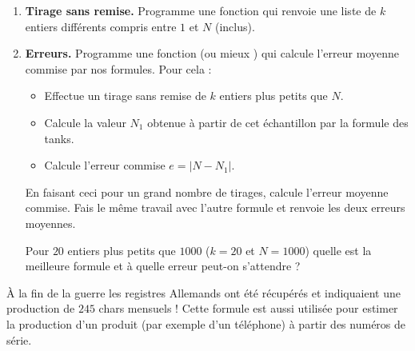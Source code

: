 \documentclass[11pt,class=report,crop=false]{standalone}
\begin{document}
\begin{activite}
\begin{enumerate}
		\item \textbf{Tirage sans remise.}
		Programme une fonction  qui renvoie une liste de $k$ entiers différents compris entre $1$ et $N$ (inclus).
		
		\item \textbf{Erreurs.} Programme une fonction 
		(ou mieux ) qui calcule l'erreur moyenne commise par nos formules. 
		Pour cela :
		\begin{itemize}
			\item Effectue un tirage sans remise de $k$ entiers plus petits que $N$.
			\item Calcule la valeur $N_1$ obtenue à partir de cet échantillon par la formule des tanks.
			\item Calcule l'erreur commise $e = | N - N_1 |$. 
		\end{itemize}
		En faisant ceci pour un grand nombre de tirages, calcule l'erreur moyenne commise.
		Fais le même travail avec l'autre formule et renvoie les deux erreurs moyennes.
		
		Pour $20$ entiers plus petits que $1000$ ($k=20$ et $N=1000$) quelle est la meilleure formule et à quelle erreur peut-on s'attendre ?
		
	\end{enumerate}
	
	\`A la fin de la guerre les registres Allemands ont été récupérés et indiquaient une production de $245$ chars mensuels !
	Cette formule est aussi utilisée pour estimer la production d'un produit (par exemple d'un téléphone) à partir des numéros de série.
\end{activite}



\end{document}
